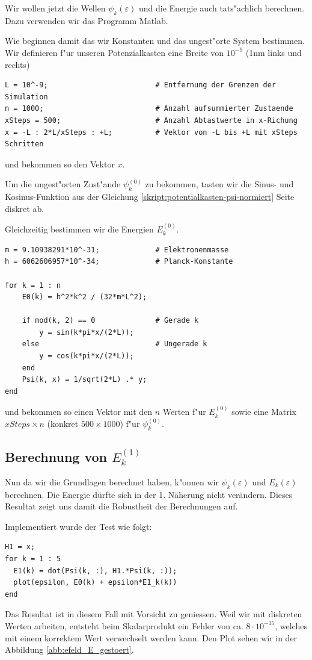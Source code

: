 \begin{refsection}
Wir wollen jetzt die Wellen $\psi_k(\varepsilon)$ und die Energie auch tats"achlich berechnen.
Dazu verwenden wir das Programm Matlab.

Wie beginnen damit das wir Konstanten und das ungest"orte System bestimmen.
Wir definieren f"ur unseren Potenzialkasten eine Breite von $10^{-9}$ (1nm links und rechts)
\begin{lstlisting}[style=Matlab]
L = 10^-9;                         # Entfernung der Grenzen der Simulation
n = 1000;                          # Anzahl aufsummierter Zustaende
xSteps = 500;                      # Anzahl Abtastwerte in x-Richung
x = -L : 2*L/xSteps : +L;          # Vektor von -L bis +L mit xSteps Schritten
\end{lstlisting}
und bekommen so den Vektor $x$.

Um die ungest"orten Zust"ande $\psi_k^{(0)}$ zu bekommen, tasten wir die Sinus- und Kosinus-Funktion 
aus der Gleichung \ref{skript:potentialkasten-psi-normiert} Seite \pageref{skript:potentialkasten-psi-normiert} diskret ab.

Gleichzeitig bestimmen wir die Energien $E_k^{(0)}$.
\begin{lstlisting}[style=Matlab]
m = 9.10938291*10^-31;             # Elektronenmasse
h = 6062606957*10^-34;             # Planck-Konstante

for k = 1 : n
    E0(k) = h^2*k^2 / (32*m*L^2);
    
    if mod(k, 2) == 0              # Gerade k
        y = sin(k*pi*x/(2*L));
    else                           # Ungerade k
        y = cos(k*pi*x/(2*L));
    end
    Psi(k, x) = 1/sqrt(2*L) .* y;
end
\end{lstlisting}
und bekommen so einen Vektor mit den $n$ Werten f"ur $E_k^{(0)}$
sowie eine Matrix $xSteps \times n$ (konkret $500 \times 1000$) f"ur $\psi_k^{(0)}$.

\subsection{Berechnung von $E_k^{(1)}$}

Nun da wir die Grundlagen berechnet haben, k"onnen wir $\psi_k(\varepsilon)$ und 
$E_k(\varepsilon)$ berechnen. Die Energie d\"urfte sich in der 1. N\"aherung nicht ver\"andern.
Dieses Resultat zeigt uns damit die Robustheit der Berechnungen auf.

Implementiert wurde der Test wie folgt:
\begin{lstlisting}[style=Matlab]
H1 = x;
for k = 1 : 5
  E1(k) = dot(Psi(k, :), H1.*Psi(k, :));
  plot(epsilon, E0(k) + epsilon*E1_k(k))
end
\end{lstlisting}
Das Resultat ist in diesem Fall mit Vorsicht zu geniessen.
Weil wir mit diskreten Werten arbeiten, entsteht beim Skalarprodukt ein Fehler von ca. $8 \cdot 10^{-15}$,
welches mit einem korrektem Wert verwechselt werden kann.
Den Plot sehen wir in der Abbildung \ref{abb:efeld_E_gestoert}.





\end{refsection}
